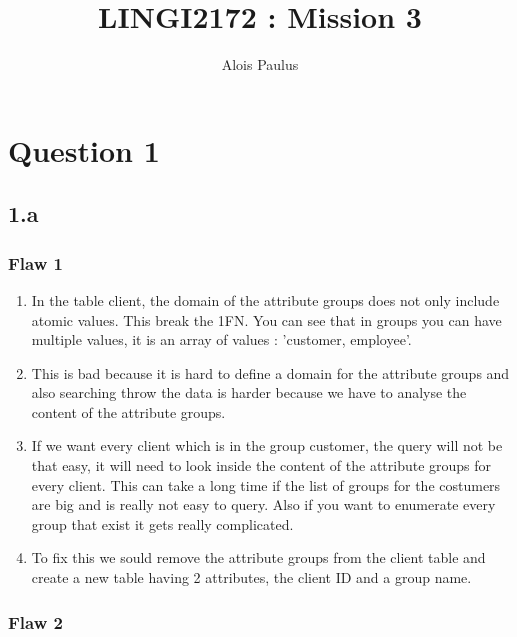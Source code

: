 \documentclass[a4paper, 12pt]{article}
\title{LINGI2172 : Mission 3}
\author{Alois Paulus}
\begin{document}
\maketitle

\section{Question 1}

\subsection{1.a}

\subsubsection{Flaw 1}

\begin{enumerate}
\item In the table client, the domain of the attribute groups does not only include atomic values. This break the 1FN.
You can see that in groups you can have multiple values, it is an array of values : 'customer, employee'. 

\item This is bad because it is hard to define a domain for the attribute groups and also searching throw the data is harder because we have
to analyse the content of the attribute groups.

\item If we want every client which is in the group customer, the query will not be that easy, it will need to look inside the content of the attribute groups for every client. This can take a long time if the list of groups for the costumers are big and is really not easy to query. Also if you want to enumerate every group that exist it gets really complicated.

\item To fix this we sould remove the attribute groups from the client table and create a new table having 2 attributes, the client ID and a group name.
\end{enumerate}
 
\subsubsection{Flaw 2}
\end{document}
